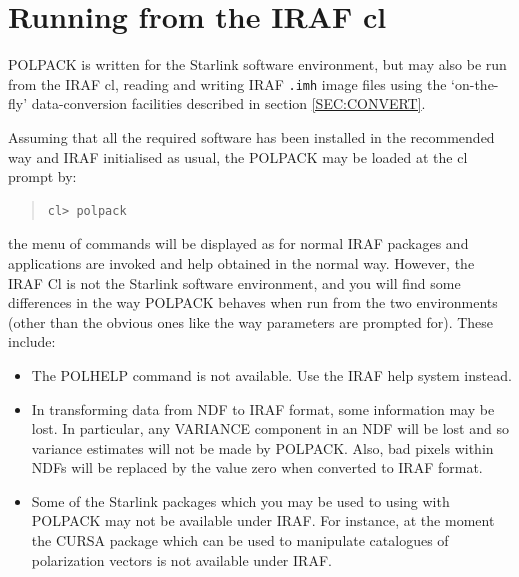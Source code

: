 \documentclass[twoside,11pt]{article}
\newcommand{\htmladdnormallink}[2]{#1}
\newcommand{\hyperref}[4]{#2\ref{#4}#3}
\newcommand{\htmlref}[2]{#1}
\newcommand{\xref}[3]{#1}
\renewcommand{\_}{\texttt{\symbol{95}}}
\newenvironment{myquote}{\begin{quote}\begin{small}}{\end{small}\end{quote}}
\newcommand{\IRAFURL}{http://www.starlink.rl.ac.uk/iraf/web/iraf-homepage.html}
\begin{document}
\section{Running from the IRAF cl}
POLPACK is written for the \xref{Starlink software environment}{sg5}{},
but may also be run from the \htmladdnormallink{IRAF}{\IRAFURL} cl,
reading and writing IRAF \texttt{.imh} image files using the `on-the-fly'
data-conversion facilities described \hyperref{here} {in section }{}
{SEC:CONVERT}.

Assuming that all the \htmlref{required software}{required_software}
has been installed in the \xref{recommended way}{sun217}
{installing_the_starlink_software} and IRAF initialised as usual, the 
POLPACK may be loaded at the cl prompt by:

\begin{myquote} 
\begin{verbatim}
cl> polpack
\end{verbatim} 
\end{myquote}

the menu of commands will be displayed as for normal IRAF packages and
applications are invoked and help obtained in the normal way. However,
the IRAF Cl is not the Starlink software environment, and you will find
some differences in the way POLPACK behaves when run from the two
environments (other than the obvious ones like the way parameters are
prompted for). These include:

\begin{itemize}

\item The \htmlref{POLHELP}{POLHELP} command is not available. Use the
IRAF help system instead.

\item In transforming data from NDF to IRAF format, some information may
be lost. In particular, any VARIANCE component in an NDF will be lost and
so variance estimates will not be made by POLPACK. Also, bad pixels
within NDFs will be replaced by the value zero when converted to IRAF
format.

\item Some of the Starlink packages which you may be used to using with
POLPACK may not be available under IRAF. For instance, at the moment the
\xref{CURSA}{sun190}{} package which can be used to manipulate catalogues of
polarization vectors is not available under IRAF.

\end{itemize}
\end{document}
